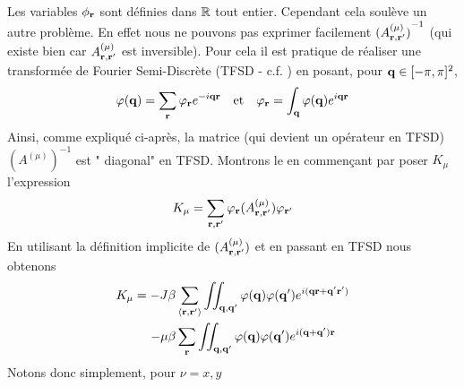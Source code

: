 \documentclass[10.5pt]{article}
\begin{document}
\begin{multicols}{2}
Les variables $\phi_{\bf r}$ sont définies dans $\mathbb{R}$ tout entier. Cependant cela soulève un autre problème. En effet nous ne pouvons pas exprimer facilement ${(A_{{\bf r}, {\bf r}'}^{(\mu)})}^{-1}$ (qui existe bien car $A_{{\bf r}, {\bf r}'}^{(\mu)}$ est inversible). Pour cela il est pratique de réaliser une transformée de Fourier Semi-Discrète (TFSD - c.f. ) en posant, pour ${\bf q} \in [-\pi, \pi]^2$,
\begin{equation}
  {\varphi}({\bf q}) = \sum_{\bf r} \varphi_{\bf r} e^{-i{\bf q}{\bf r}} \quad \text{et} \quad \varphi_{\bf r} = \int_{\bf q} {\varphi}({\bf q})  e^{i{\bf q}{\bf r}}
\end{equation}
Ainsi, comme expliqué ci-après, la matrice (qui devient un opérateur en TFSD) ${(A^{(\mu)})}^{-1}$ est " diagonal" en TFSD. Montrons le en commençant par poser $K_\mu$ l'expression
\begin{equation}
	K_\mu = \sum\limits_{{\bf r}, {\bf r}'} \varphi_{\bf r} {(A_{{\bf r}, {\bf r}'}^{(\mu)})} \varphi_{{\bf r}'}
\end{equation} 
En utilisant la définition implicite de ${(A_{{\bf r}, {\bf r}'}^{(\mu)})}$ et en passant en TFSD nous obtenons
\begin{equation}
\begin{split}
  K_\mu = -J\beta & \sum_{\left<{\bf r}, {\bf r}'\right>} \iint_{{\bf q},{\bf q}'} {\varphi}({\bf q}) {\varphi}({\bf q}')  e^{i({\bf q}{\bf r}+{\bf q}'{\bf r}')} \\
   -\mu\beta & \sum_{\bf r} \iint_{{\bf q},{\bf q}'} {\varphi}({\bf q}) {\varphi}({\bf q}')  e^{i({\bf q}+{\bf q}'){\bf r}}
\end{split}
\end{equation}
Notons donc simplement, pour $\nu = x, y$

\end{multicols}
\end{document}
